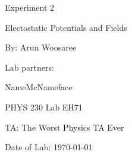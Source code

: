 \documentclass[letterpaper]{article}
\begin{document}
  \begin{titlepage}
    \begin{center}
        \vspace*{1cm}
        \Huge
        Experiment 2
        \vspace{1cm}

        Electostatic Potentials and Fields
        \vspace{1cm}

        By: Arun Woosaree
        \vspace{1cm}

        Lab partners:

        \vspace{1cm}
        \Large
        NameMcNameface
        \vspace{1cm}

        \Huge
        PHYS 230 Lab EH71
        \vspace{1cm}

        TA: The Worst Physics TA Ever
        \vspace{1cm}

        Date of Lab: \today
        \vfill
    \end{center}
\end{titlepage}
\end{document}
